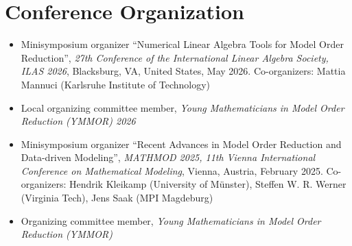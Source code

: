 \documentclass[10pt,a4paper,sans]{moderncv}        %
\begin{document}
\section{Conference Organization}
\vspace{5pt}
\begin{itemize}
    \item Minisymposium organizer ``Numerical Linear Algebra Tools for Model Order Reduction'', \textit{27th Conference of the International Linear Algebra Society, ILAS 2026}, Blacksburg, VA, United States, May 2026. Co-organizers: Mattia Mannuci (Karlsruhe Institute of Technology)
    \vspace{2mm}
    \item Local organizing committee member, \textit{Young Mathematicians in Model Order Reduction (YMMOR) 2026}
    \vspace{2mm}
    \item Minisymposium organizer ``Recent Advances in Model Order Reduction and Data-driven Modeling'', \textit{MATHMOD 2025, 11th Vienna International Conference on Mathematical Modeling}, Vienna, Austria, February 2025. Co-organizers: Hendrik Kleikamp (University of M{\"u}nster), Steffen W. R. Werner (Virginia Tech), Jens Saak (MPI Magdeburg)
    \vspace{2mm}
    \item Organizing committee member, \textit{Young Mathematicians in Model Order Reduction (YMMOR)}
\end{itemize}

\end{document}
